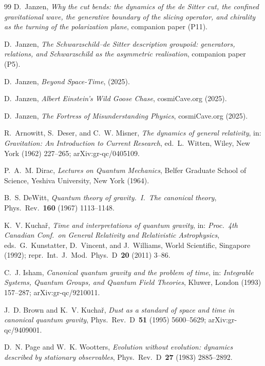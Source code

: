 \documentclass[11pt,a4paper]{article}
\theoremstyle{plain}
\theoremstyle{definition}
\theoremstyle{remark}
\begin{document}
\begin{thebibliography}{99}
D.~Janzen,
\emph{Why the cut bends: the dynamics of the de Sitter cut, the confined gravitational wave, the generative boundary of the slicing operator, and chirality as the turning of the polarization plane}, companion paper (P11).

D.~Janzen,
\emph{The Schwarzschild--de Sitter description groupoid: generators, relations, and Schwarzschild as the asymmetric realisation}, companion paper (P5).

D.~Janzen,
\emph{Beyond Space-Time},
(2025).

D.~Janzen,
\emph{Albert Einstein's Wild Goose Chase},
cosmiCave.org (2025).

D.~Janzen,
\emph{The Fortress of Misunderstanding Physics},
cosmiCave.org (2025).

R.~Arnowitt, S.~Deser, and C.~W. Misner,
\emph{The dynamics of general relativity},
in: \emph{Gravitation: An Introduction to Current Research}, ed.~L.~Witten, Wiley, New York (1962) 227--265; arXiv:gr-qc/0405109.

P.~A.~M. Dirac,
\emph{Lectures on Quantum Mechanics},
Belfer Graduate School of Science, Yeshiva University, New York (1964).

B.~S. DeWitt,
\emph{Quantum theory of gravity.~I.~The canonical theory},
Phys.~Rev.~\textbf{160} (1967) 1113--1148.

K.~V. Kucha\v{r},
\emph{Time and interpretations of quantum gravity},
in: \emph{Proc.~4th Canadian Conf.~on General Relativity and Relativistic Astrophysics}, eds.~G.~Kunstatter, D.~Vincent, and J.~Williams, World Scientific, Singapore (1992); repr.~Int.~J.~Mod.~Phys.~D~\textbf{20} (2011) 3--86.

C.~J. Isham,
\emph{Canonical quantum gravity and the problem of time},
in: \emph{Integrable Systems, Quantum Groups, and Quantum Field Theories}, Kluwer, London (1993) 157--287; arXiv:gr-qc/9210011.

J.~D. Brown and K.~V. Kucha\v{r},
\emph{Dust as a standard of space and time in canonical quantum gravity},
Phys.~Rev.~D~\textbf{51} (1995) 5600--5629; arXiv:gr-qc/9409001.

D.~N. Page and W.~K. Wootters,
\emph{Evolution without evolution: dynamics described by stationary observables},
Phys.~Rev.~D~\textbf{27} (1983) 2885--2892.


\end{thebibliography}
\end{document}
